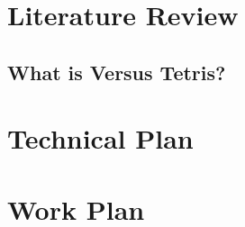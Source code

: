 \documentclass[a4paper, 12pt]{extreport}
\begin{document}
	\chapter{Literature Review}
		
		
		
		\section{What is Versus Tetris?}
	
	\chapter{Technical Plan}
	
	
	\chapter{Work Plan}
		
	
	\printbibliography[heading={bibnumbered}, title={References}]
		
\end{document}
